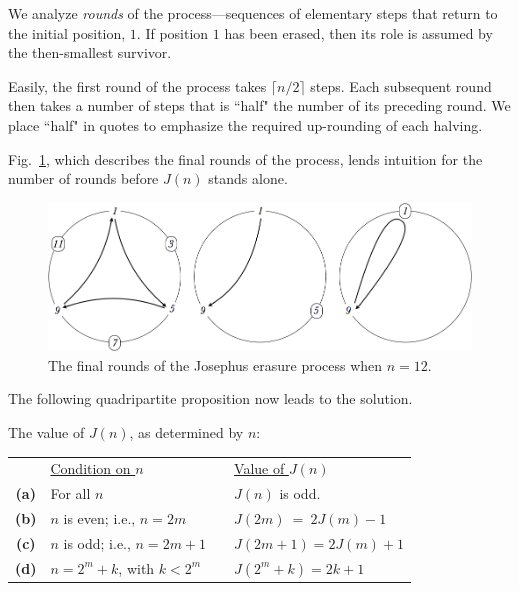 \begin{enumerate}
\medskip

We analyze \textit{rounds} of the process---sequences of elementary steps that return to the initial position, $1$.  If position $1$ has been erased, then its role is assumed by the then-smallest survivor.

\smallskip

Easily, the first round of the process takes $\lceil n/2 \rceil$ steps.  Each subsequent round then takes a number of steps that is ``half" the number of its preceding round.  We place ``half" in quotes to emphasize the required up-rounding of each halving.  

\medskip

Fig.~\ref{fig:josephus12step2}, which describes the final rounds of the process, lends intuition for the number of rounds before $J(n)$ stands alone.
\begin{figure}[ht]
\begin{center}
        \includegraphics[scale=0.25]{FiguresMaths/josephus12LastSteps}
        \caption{The final rounds of the Josephus erasure process when $n=12$.}
        \label{fig:josephus12step2}
\end{center}
\end{figure}

\medskip

The following quadripartite proposition now leads to the solution.

\begin{prop}
The value of $J(n)$, as determined by $n$:

\begin{tabular}{clll}
 & \underline{Condition on $n$} & \hspace*{.1in} & \underline{Value of $J(n)$} \\ 
{\bf (a)} &
For all $n$ &  & $J(n)$ is odd. \\
{\bf (b)} &
$n$ is even; i.e., $n = 2m$ & & $J(2m) \ = \ 2J(m)-1$ \\
{\bf (c)} &
$n$ is odd; i.e., $n = 2m+1$ & & $J(2m+1) = 2J(m)+1$ \\
{\bf (d)} &
$n = 2^m+k$, with $k < 2^m$ & & $J(2^m+k) = 2k+1$
\end{tabular}
\end{prop}


\end{enumerate}
